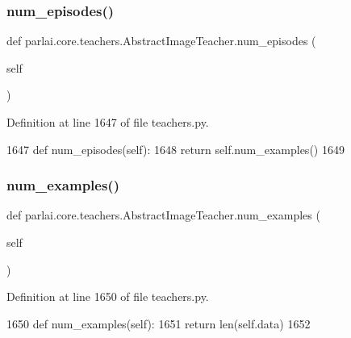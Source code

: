 \subsubsection{\texorpdfstring{num\+\_\+episodes()}{num\_episodes()}}
{\footnotesize\ttfamily def parlai.\+core.\+teachers.\+Abstract\+Image\+Teacher.\+num\+\_\+episodes (\begin{DoxyParamCaption}\item[{}]{self }\end{DoxyParamCaption})}



Definition at line 1647 of file teachers.\+py.


\begin{DoxyCode}
1647     \textcolor{keyword}{def }num\_episodes(self):
1648         \textcolor{keywordflow}{return} self.num\_examples()
1649 
\end{DoxyCode}
\mbox{\label{classparlai_1_1core_1_1teachers_1_1AbstractImageTeacher_a4f5565f49b0aef6d084257b5090a7e40}} 
\subsubsection{\texorpdfstring{num\+\_\+examples()}{num\_examples()}}
{\footnotesize\ttfamily def parlai.\+core.\+teachers.\+Abstract\+Image\+Teacher.\+num\+\_\+examples (\begin{DoxyParamCaption}\item[{}]{self }\end{DoxyParamCaption})}



Definition at line 1650 of file teachers.\+py.


\begin{DoxyCode}
1650     \textcolor{keyword}{def }num\_examples(self):
1651         \textcolor{keywordflow}{return} len(self.data)
1652 
\end{DoxyCode}
\mbox{\label{classparlai_1_1core_1_1teachers_1_1AbstractImageTeacher_a13b4576dd3a045944ff1b44cb88a2764}} 
